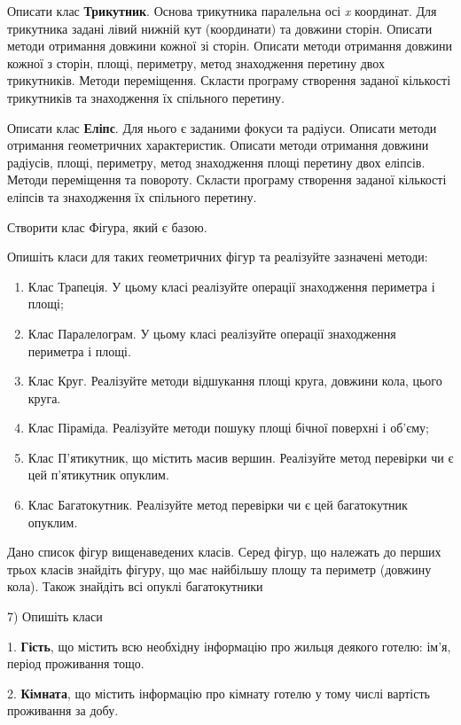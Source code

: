 \documentclass[]{article}
\makeatletter
\newcommand{\xslalph}[1]{\expandafter\@xslalph\csname c@#1\endcsname}
\newcommand{\@xslalph}[1]{%
    \ifcase#1\or а\or б\or в\or г\or д\or e\or є\or ж\or з\or i%
    \or й\or к\or л\or м\or н\or о\or п\or р\or с\or т%
    \or у\or ф\or х\or ц\or ч\or ш\or ю\or я\or аа\or бб\or вв%
    \else\@ctrerr\fi%
}
\makeatother
\begin{document}
\begin{enumerate}
\begin{enumerate}[label=\xslalph*)]
\begin{enumerate}
\begin{enumerate}[label=\xslalph*)]
Описати клас \textbf{Трикутник}. Основа трикутника паралельна осі
\emph{x} координат. Для трикутника задані лівий нижній кут (координати)
та довжини сторін. Описати методи отримання довжини кожної зі сторін.
Описати методи отримання довжини кожної з сторін, площі, периметру,
метод знаходження перетину двох трикутників. Методи переміщення. Скласти
програму створення заданої кількості трикутників та знаходження їх
спільного перетину.

Описати клас \textbf{Еліпс}. Для нього є заданими фокуси та радіуси.
Описати методи отримання геометричних характеристик. Описати методи
отримання довжини радіусів, площі, периметру, метод знаходження площі
перетину двох еліпсів. Методи переміщення та повороту. Скласти програму
створення заданої кількості еліпсів та знаходження їх спільного
перетину.

Створити клас Фігура, який є базою.

Опишіть класи для таких геометричних фігур та реалізуйте зазначені
методи:

\begin{enumerate}
\def\labelenumi{\alph{enumi})}
\item
  Клас Трапеція. У цьому класі реалізуйте операції знаходження периметра
  і площі;
\item
  Клас Паралелограм. У цьому класі реалізуйте операції знаходження
  периметра і площі.
\item
  Клас Круг. Реалізуйте методи відшукання площі круга, довжини кола,
  цього круга.
\item
  Клас Піраміда. Реалізуйте методи пошуку площі бічної поверхні і
  об'єму;
\item
  Клас П'ятикутник, що містить масив вершин. Реалізуйте метод перевірки
  чи є цей п'ятикутник опуклим.
\item
  Клас Багатокутник. Реалізуйте метод перевірки чи є цей багатокутник
  опуклим.
\end{enumerate}

Дано список фігур вищенаведених класів. Серед фігур, що належать до
перших трьох класів знайдіть фігуру, що має найбільшу площу та периметр
(довжину кола). Також знайдіть всі опуклі багатокутники

7) Опишіть класи

1. \textbf{Гість}, що містить всю необхідну інформацію про жильця
деякого готелю: ім'я, період проживання тощо.

2. \textbf{Кімната}, що містить інформацію про кімнату готелю у тому
числі вартість проживання за добу.


\end{enumerate}
\end{enumerate}
\end{enumerate}
\end{enumerate}
\end{document}
